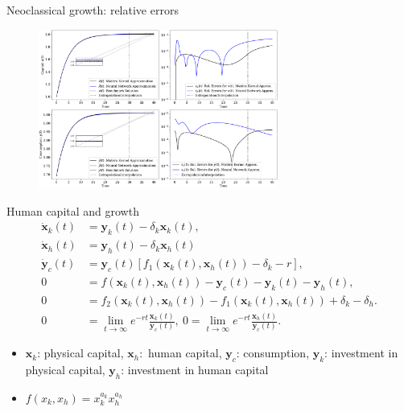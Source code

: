 \documentclass[aspectratio=169,10pt]{beamer}
\begin{document}
\begin{frame}{Neoclassical growth: relative errors}
	\label{errors}
	\begin{figure}[t!]
		\centering
		\includegraphics[width=0.7\textwidth]{figs/neoclassical_growth_model_baseline.pdf}
		\vspace{-4mm}
	\end{figure}
			\hyperlink{ncg:results}{}
\end{frame}

\begin{frame}{Human capital and growth}
	\label{DAE}
\begin{align*}
	\dot{\mathbf{x}}_k(t) & = \mathbf{y}_{k}(t)-\delta_k \mathbf{x}_k(t),\\
	\dot{\mathbf{x}}_h(t) & = \mathbf{y}_{h}(t)-\delta_k \mathbf{x}_h(t)\\
	\dot{\mathbf{y}}_c(t) &= \mathbf{y}_c(t) \left[ f_1\left(\mathbf{x}_k(t),\mathbf{x}_h(t)\right) -\delta_k - r \right],\\
	0 & =   f\left(\mathbf{x}_k(t),\mathbf{x}_h(t)\right) - \mathbf{y}_c(t) -  \mathbf{y}_{k}(t) -  \mathbf{y}_{h}(t), \label{eq:human-capital-feasibility-condition}\\
	0 & = f_2\left(\mathbf{x}_k(t),\mathbf{x}_h(t)\right) - f_1\left(\mathbf{x}_k(t),\mathbf{x}_h(t)\right) + \delta_k-\delta_h.\\
		0 & = \lim_{t\rightarrow \infty} e^{-r t}\frac{\mathbf{x}_k(t)}{\mathbf{y}_c(t)}, ~
	0 = \lim_{t\rightarrow \infty} e^{-r t}\frac{\mathbf{x}_h(t)}{\mathbf{y}_c(t)}.
\end{align*}


\begin{itemize}
	\item $\mathbf{x}_k$: physical capital,  $\mathbf{x}_h:$ human capital, $\mathbf{y}_c$: consumption, $\mathbf{y}_k$: investment in physical capital, $\mathbf{y}_h$: investment in human capital 
	\vspace{0.1in}
	\item $f\left(x_k, x_h\right) = x_k^{a_k}x_h^{a_h}$
\end{itemize}
\hyperlink{butterfly}{}
\end{frame}
\end{document}

